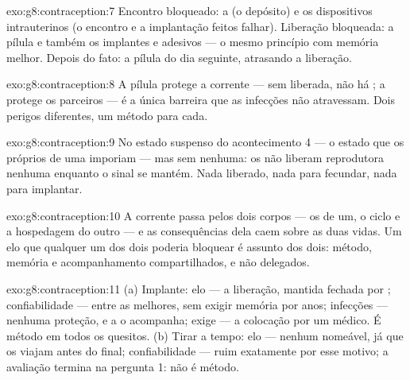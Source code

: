 \begin{solution}{exo:g8:contraception:7}
Encontro bloqueado: a  (o depósito) e os dispositivos
intrauterinos (o encontro e a implantação feitos falhar). Liberação
bloqueada: a pílula e também os implantes e adesivos --- o mesmo
princípio com memória melhor. Depois do fato: a pílula do dia
seguinte, atrasando a liberação.
\end{solution}

\begin{solution}{exo:g8:contraception:8}
A pílula protege a corrente --- sem 
liberada, não há ; a  protege os parceiros --- é a
única barreira que as infecções não atravessam. Dois perigos
diferentes, um método para cada.
\end{solution}

\begin{solution}{exo:g8:contraception:9}
No estado suspenso do acontecimento 4 --- o estado que os próprios
 de uma  imporiam --- mas sem  nenhuma: os
 não liberam  reprodutora nenhuma enquanto o sinal se
mantém. Nada liberado, nada para fecundar, nada para implantar.
\end{solution}

\begin{solution}{exo:g8:contraception:10}
A corrente passa pelos dois corpos --- os  de um, o ciclo e a
hospedagem do outro --- e as consequências dela caem sobre as duas
vidas. Um elo que qualquer um dos dois poderia bloquear é assunto dos
dois: método, memória e acompanhamento compartilhados, e não
delegados.
\end{solution}

\begin{solution}{exo:g8:contraception:11}
(a) Implante: elo --- a liberação, mantida fechada por ;
confiabilidade --- entre as melhores, sem exigir memória por anos;
infecções --- nenhuma proteção, e a  o acompanha; exige --- a
colocação por um médico. É método em todos os quesitos. (b) Tirar a
tempo: elo --- nenhum nomeável, já que os  viajam antes
do final; confiabilidade --- ruim exatamente por esse motivo; a
avaliação termina na pergunta 1: não é método.
\end{solution}

